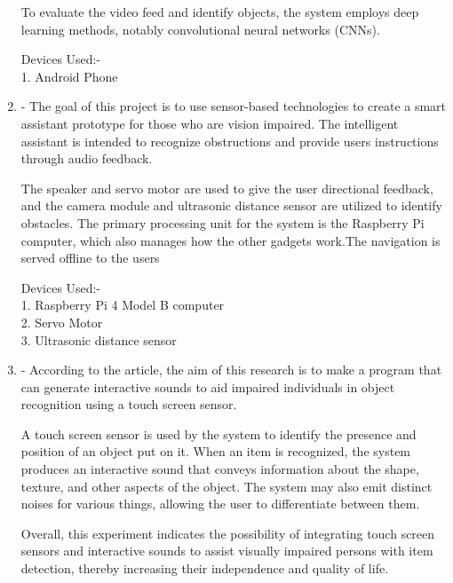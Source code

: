 \documentclass[MScCS]{uccthesis}
\begin{document}
\begin{enumerate}
To evaluate the video feed and identify objects, the system employs deep learning methods, notably convolutional neural networks (CNNs).

Devices Used:-\\
1. Android Phone


\item \textbf{\Parencite{sensor} }- The goal of this project is to use sensor-based technologies to create a smart assistant prototype for those who are vision impaired. The intelligent assistant is intended to recognize obstructions and provide users instructions through audio feedback.

The speaker and servo motor are used to give the user directional feedback, and the camera module and ultrasonic distance sensor are utilized to identify obstacles. The primary processing unit for the system is the Raspberry Pi computer, which also manages how the other gadgets work.The navigation is served offline to the users

Devices Used:-\\
1. Raspberry Pi 4 Model B computer\\
2. Servo Motor\\
3. Ultrasonic distance sensor\\

\item \textbf{\Parencite{interactive}}- According to the article, the aim of this research is to make a program that can generate interactive sounds to aid impaired individuals in object recognition using a touch screen sensor.

A touch screen sensor is used by the system to identify the presence and position of an object put on it. When an item is recognized, the system produces an interactive sound that conveys information about the shape, texture, and other aspects of the object. The system may also emit distinct noises for various things, allowing the user to differentiate between them.

Overall, this experiment indicates the possibility of integrating touch screen sensors and interactive sounds to assist visually impaired persons with item detection, thereby increasing their independence and quality of life.


\end{enumerate}
\end{document}
